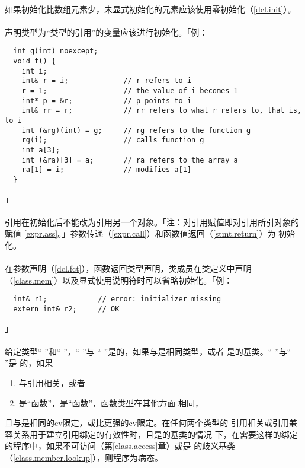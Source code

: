 \paragraph{}
如果初始化比数组元素少，未显式初始化的元素应该使用零初始化（\ref{dcl.init}）。

\paragraph{}
声明类型为``类型的引用''的变量应该进行初始化。「例：
\begin{lstlisting}
  int g(int) noexcept;
  void f() {
    int i;
    int& r = i;             // r refers to i
    r = 1;                  // the value of i becomes 1
    int* p = &r;            // p points to i
    int& rr = r;            // rr refers to what r refers to, that is, to i
    int (&rg)(int) = g;     // rg refers to the function g
    rg(i);                  // calls function g
    int a[3];
    int (&ra)[3] = a;       // ra refers to the array a
    ra[1] = i;              // modifies a[1]
  }
\end{lstlisting}」

\paragraph{}
引用在初始化后不能改为引用另一个对象。「注：对引用赋值即对引用所引对象的赋值
\ref{expr.ass}。」参数传递（\ref{expr.call}）和函数值返回（\ref{stmt.return}）为
初始化。

\paragraph{}
在参数声明（\ref{dcl.fct}），函数返回类型声明，类成员在类定义中声明
（\ref{class.mem}）以及显式使用说明符时可以省略初始化。「例：
\begin{lstlisting}
  int& r1;            // error: initializer missing
  extern int& r2;     // OK
\end{lstlisting}」

\paragraph{}
给定类型`` ''和`` ''，`` ''与
`` ''是的，如果与是相同类型，或者
是的基类。`` ''与`` ''是
的，如果
\begin{enumerate}
  \item{与引用相关，或者}
  \item{是``函数''，是``函数''，函数类型在其他方面
    相同，}
\end{enumerate}
且与是相同的cv限定，或比更强的cv限定。在任何两个类型的
引用相关或引用兼容关系用于建立引用绑定的有效性时，且是的基类的情况
下，在需要这样的绑定的程序中，如果不可访问（第\ref{class.access}章）或是
的歧义基类（\ref{class.member.lookup}），则程序为病态。

